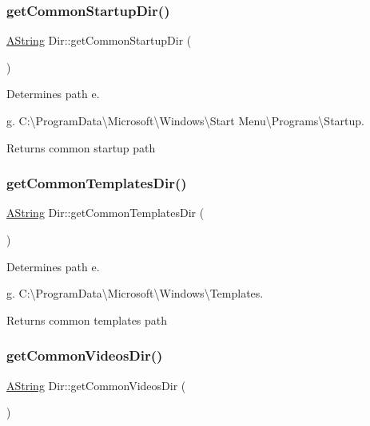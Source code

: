 \subsubsection{\texorpdfstring{getCommonStartupDir()}{getCommonStartupDir()}}
{\footnotesize\ttfamily \mbox{\hyperlink{class_a_string}{A\+String}} Dir\+::get\+Common\+Startup\+Dir (\begin{DoxyParamCaption}{ }\end{DoxyParamCaption})\hspace{0.3cm}{\ttfamily [static]}}



Determines path e. 

g. C\+:\textbackslash{}\+Program\+Data\textbackslash{}\+Microsoft\textbackslash{}\+Windows\textbackslash{}\+Start Menu\textbackslash{}\+Programs\textbackslash{}\+Startup. \begin{DoxyReturn}{Returns}
common startup path 
\end{DoxyReturn}
\mbox{\label{class_dir_aa8156c23b2330137f8a900a72e6a23a6}} 
\subsubsection{\texorpdfstring{getCommonTemplatesDir()}{getCommonTemplatesDir()}}
{\footnotesize\ttfamily \mbox{\hyperlink{class_a_string}{A\+String}} Dir\+::get\+Common\+Templates\+Dir (\begin{DoxyParamCaption}{ }\end{DoxyParamCaption})\hspace{0.3cm}{\ttfamily [static]}}



Determines path e. 

g. C\+:\textbackslash{}\+Program\+Data\textbackslash{}\+Microsoft\textbackslash{}\+Windows\textbackslash{}\+Templates. \begin{DoxyReturn}{Returns}
common templates path 
\end{DoxyReturn}
\mbox{\label{class_dir_aa5898bb30aa94b0fa079e639351a3d3c}} 
\subsubsection{\texorpdfstring{getCommonVideosDir()}{getCommonVideosDir()}}
{\footnotesize\ttfamily \mbox{\hyperlink{class_a_string}{A\+String}} Dir\+::get\+Common\+Videos\+Dir (\begin{DoxyParamCaption}{ }\end{DoxyParamCaption})\hspace{0.3cm}{\ttfamily [static]}}



